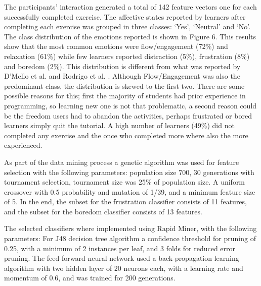 \documentclass[a4paper]{llncs}
\begin{document}
The participants' interaction generated a total of 142 feature vectors one for each
successfully completed exercise. The affective states reported by learners after
completing each exercise was grouped in three classes: ‘Yes’, ‘Neutral’ and
‘No’. The class distribution of the emotions reported is shown in Figure 6. This
results show that the most common emotions were flow/engagement (72\%) and
relaxation (61\%) while few learners reported distraction (5\%), frustration
(8\%) and boredom (2\%). This distribution is different from what was reported
by D’Mello et al. \cite{bixler2013detecting} and Rodrigo et al. \cite{rodrigo2009affective}.
Although Flow/Engagement was
also the predominant class, the distribution is skewed to the first two. There
are some possible reasons for this; first the majority of students had
prior experience in programming, so learning new one is not that problematic, a second
reason could be the freedom users had to abandon the activities, perhaps
frustrated or bored learners simply quit the tutorial. A high number of learners
(49\%) did not completed any exercise and the once who completed more where also
the more experienced.

As part of the data mining process a genetic algorithm was used for feature
selection with the following parameters: population size 700, 30 generations with
tournament selection, tournament size was 25\% of population size. A uniform crossover 
with 0.5 probability and mutation of 1/39, and a minimum feature size of 5.
In the end, the subset for the frustration classifier
consists of 11 features, and the subset for the boredom classifier consists of
13 features.

The selected classifiers where implemented using Rapid Miner, with the following parameters:
For J48 decision tree algorithm a confidence threshold for pruning of 0.25, with a
minimum of 2 instances per leaf, and 3 folds for reduced error pruning. The feed-forward 
neural network used a back-propagation learning algorithm with two hidden layer of 20 neurons
each, with a learning rate and momentum of 0.6, and was trained for 200 generations.
\end{document}
